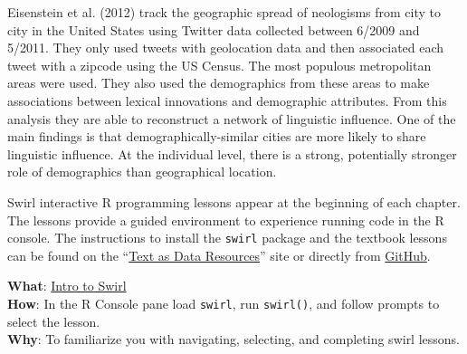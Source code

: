 \documentclass[
  letterpaper,
]{latex/krantz}
\begin{document}
\begin{tcolorbox}[enhanced jigsaw, toprule=.15mm, bottomtitle=1mm, coltitle=black, title=\textcolor{quarto-callout-caution-color}{\faFire}\hspace{0.5em}{Case study}, left=2mm, colframe=quarto-callout-caution-color-frame, bottomrule=.15mm, colbacktitle=quarto-callout-caution-color!10!white, leftrule=.75mm, colback=white, titlerule=0mm, breakable, toptitle=1mm, opacityback=0, arc=.35mm, rightrule=.15mm, opacitybacktitle=0.6]

Eisenstein et al. (2012) track the geographic spread of neologisms from
city to city in the United States using Twitter data collected between
6/2009 and 5/2011. They only used tweets with geolocation data and then
associated each tweet with a zipcode using the US Census. The most
populous metropolitan areas were used. They also used the demographics
from these areas to make associations between lexical innovations and
demographic attributes. From this analysis they are able to reconstruct
a network of linguistic influence. One of the main findings is that
demographically-similar cities are more likely to share linguistic
influence. At the individual level, there is a strong, potentially
stronger role of demographics than geographical location.

\end{tcolorbox}

Swirl interactive R programming lessons appear at the beginning of each
chapter. The lessons provide a guided environment to experience running
code in the R console. The instructions to install the \texttt{swirl}
package and the textbook lessons can be found on the
``\href{https://lin380.github.io/tadr}{Text as Data Resources}'' site or
directly from \href{https://github.com/lin380/swirl}{GitHub}.

\begin{tcolorbox}[enhanced jigsaw, toprule=.15mm, bottomtitle=1mm, coltitle=black, title=\textcolor{quarto-callout-tip-color}{\faLightbulb}\hspace{0.5em}{Swirl}, left=2mm, colframe=quarto-callout-tip-color-frame, bottomrule=.15mm, colbacktitle=quarto-callout-tip-color!10!white, leftrule=.75mm, colback=white, titlerule=0mm, breakable, toptitle=1mm, opacityback=0, arc=.35mm, rightrule=.15mm, opacitybacktitle=0.6]

\textbf{What}: \href{https://github.com/lin380/swirl}{Intro to Swirl}\\
\textbf{How}: In the R Console pane load \texttt{swirl}, run
\texttt{swirl()}, and follow prompts to select the lesson.\\
\textbf{Why}: To familiarize you with navigating, selecting, and
completing swirl lessons.

\end{tcolorbox}
\end{document}
